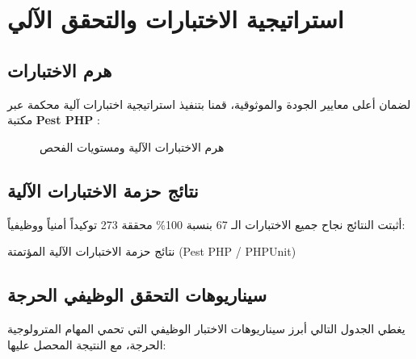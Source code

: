 \documentclass{bts-report-ar}
\begin{document}
\section{استراتيجية الاختبارات والتحقق الآلي}
\subsection{هرم الاختبارات}
لضمان أعلى معايير الجودة والموثوقية، قمنا بتنفيذ استراتيجية اختبارات آلية محكمة عبر مكتبة \textbf{Pest PHP} :

\begin{figure}[H]
  \centering
  \begin{LTR}
  
  \end{LTR}
  \caption{هرم الاختبارات الآلية ومستويات الفحص}
  \label{fig:testing-pyramid}
\end{figure}

\subsection{نتائج حزمة الاختبارات الآلية}
أثبتت النتائج نجاح جميع الاختبارات الـ 67 بنسبة 100\% محققة 273 توكيداً أمنياً ووظيفياً:

\begin{teststablear}{نتائج حزمة الاختبارات الآلية المؤتمتة (Pest PHP / PHPUnit)}
\end{teststablear}

\subsection{سيناريوهات التحقق الوظيفي الحرجة}
يغطي الجدول التالي أبرز سيناريوهات الاختبار الوظيفي التي تحمي المهام المترولوجية الحرجة، مع النتيجة المحصل عليها:
\end{document}
